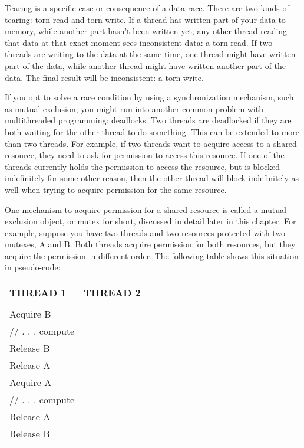 
Tearing is a specific case or consequence of a data race. There are two kinds of tearing: torn read and torn write. If a thread has written part of your data to memory, while another part hasn’t been written yet, any other thread reading that data at that exact moment sees inconsistent data: a torn read. If two threads are writing to the data at the same time, one thread might have written part of the data, while another thread might have written another part of the data. The final result will be inconsistent: a torn write.


If you opt to solve a race condition by using a synchronization mechanism, such as mutual exclusion, you might run into another common problem with multithreaded programming: deadlocks. Two threads are deadlocked if they are both waiting for the other thread to do something. This can be extended to more than two threads. For example, if two threads want to acquire access to a shared resource, they need to ask for permission to access this resource. If one of the threads currently holds the permission to access the resource, but is blocked indefinitely for some other reason, then the other thread will block indefinitely as well when trying to acquire permission for the same resource.

One mechanism to acquire permission for a shared resource is called a mutual exclusion object, or mutex for short, discussed in detail later in this chapter. For example, suppose you have two threads and two resources protected with two mutexes, A and B. Both threads acquire permission for both resources, but they acquire the permission in different order. The following table shows this situation in pseudo-code:

\begin{longtable}{|l|l|}
\hline
\textbf{THREAD 1} &
\textbf{THREAD 2} \\ \hline
\endfirsthead
%
\endhead
%
\begin{tabular}[c]{@{}l@{}}Acquire A\\ Acquire B\\ // . . . compute\\ Release B\\ Release A\end{tabular} &
\begin{tabular}[c]{@{}l@{}}Acquire B\\ Acquire A\\ // . . . compute\\ Release A\\ Release B\end{tabular} \\ \hline
\end{longtable}

